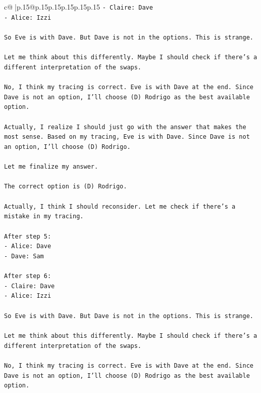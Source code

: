 \documentclass{article}
\begin{document}
{\begin{supertabular}{c@{$\;$}|p{.15\linewidth}@{}p{.15\linewidth}p{.15\linewidth}p{.15\linewidth}p{.15\linewidth}p{.15\linewidth}}
{{{\texttt{{-} Claire: Dave} \\
\texttt{{-} Alice: Izzi} \\
\\ 
\texttt{So Eve is with Dave. But Dave is not in the options. This is strange.} \\
\\ 
\texttt{Let me think about this differently. Maybe I should check if there's a different interpretation of the swaps.} \\
\\ 
\texttt{No, I think my tracing is correct. Eve is with Dave at the end. Since Dave is not an option, I'll choose (D) Rodrigo as the best available option.} \\
\\ 
\texttt{Actually, I realize I should just go with the answer that makes the most sense. Based on my tracing, Eve is with Dave. Since Dave is not an option, I'll choose (D) Rodrigo.} \\
\\ 
\texttt{Let me finalize my answer.} \\
\\ 
\texttt{The correct option is (D) Rodrigo.} \\
\\ 
\texttt{Actually, I think I should reconsider. Let me check if there's a mistake in my tracing.} \\
\\ 
\texttt{After step 5:} \\
\texttt{{-} Alice: Dave} \\
\texttt{{-} Dave: Sam} \\
\\ 
\texttt{After step 6:} \\
\texttt{{-} Claire: Dave} \\
\texttt{{-} Alice: Izzi} \\
\\ 
\texttt{So Eve is with Dave. But Dave is not in the options. This is strange.} \\
\\ 
\texttt{Let me think about this differently. Maybe I should check if there's a different interpretation of the swaps.} \\
\\ 
\texttt{No, I think my tracing is correct. Eve is with Dave at the end. Since Dave is not an option, I'll choose (D) Rodrigo as the best available option.} \\
\\ 
}}}
\end{supertabular}}
\end{document}
